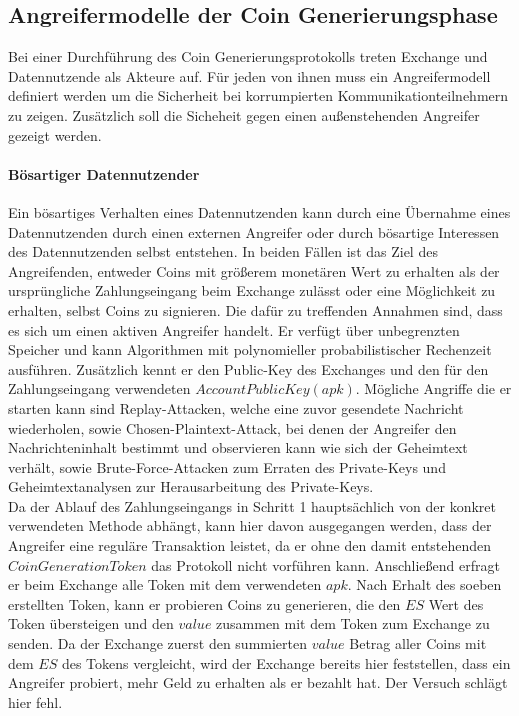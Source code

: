 \documentclass{scrreprt}
\begin{document}
\subsection{Angreifermodelle der Coin Generierungsphase}
Bei einer Durchführung des Coin Generierungsprotokolls treten Exchange und Datennutzende als Akteure auf. Für jeden von ihnen muss ein Angreifermodell definiert werden um die Sicherheit bei korrumpierten Kommunikationteilnehmern zu zeigen. Zusätzlich soll die Sicheheit gegen einen außenstehenden Angreifer gezeigt werden.

\paragraph{Bösartiger Datennutzender}
Ein bösartiges Verhalten eines Datennutzenden kann durch eine Übernahme eines Datennutzenden durch einen externen Angreifer oder durch bösartige Interessen des Datennutzenden selbst entstehen. In beiden Fällen ist das Ziel des Angreifenden, entweder Coins mit größerem monetären Wert zu erhalten als der ursprüngliche Zahlungseingang beim Exchange zulässt oder eine Möglichkeit zu erhalten, selbst Coins zu signieren. Die dafür zu treffenden Annahmen sind, dass es sich um einen aktiven Angreifer handelt. Er verfügt über unbegrenzten Speicher und kann Algorithmen mit polynomieller probabilistischer Rechenzeit ausführen. Zusätzlich kennt er den Public-Key des Exchanges und den für den Zahlungseingang verwendeten $AccountPublicKey (apk)$. Mögliche Angriffe die er starten kann sind Replay-Attacken, welche eine zuvor gesendete Nachricht wiederholen, sowie Chosen-Plaintext-Attack, bei denen der Angreifer den Nachrichteninhalt bestimmt und observieren kann wie sich der Geheimtext verhält, sowie Brute-Force-Attacken zum Erraten des Private-Keys und Geheimtextanalysen zur Herausarbeitung des Private-Keys.\\

Da der Ablauf des Zahlungseingangs in Schritt 1 hauptsächlich von der konkret verwendeten Methode abhängt, kann hier davon ausgegangen werden, dass der Angreifer eine reguläre Transaktion leistet, da er ohne den damit entstehenden $CoinGenerationToken$ das Protokoll nicht vorführen kann. 
Anschließend erfragt er beim Exchange alle Token mit dem verwendeten $apk$. Nach Erhalt des soeben erstellten Token, kann er probieren Coins zu generieren, die den $ES$ Wert des Token übersteigen und den $value$ zusammen mit dem Token zum Exchange zu senden. Da der Exchange zuerst den summierten $value$ Betrag aller Coins mit dem $ES$ des Tokens vergleicht, wird der Exchange bereits hier feststellen, dass ein Angreifer probiert, mehr Geld zu erhalten als er bezahlt hat. Der Versuch schlägt hier fehl.\\
\end{document}

